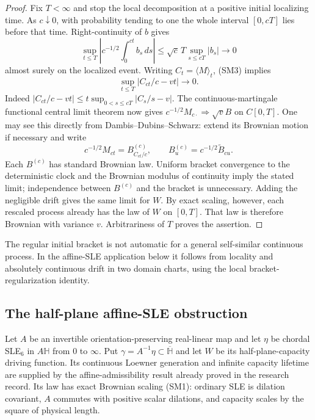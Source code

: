\documentclass[11pt]{article}
\theoremstyle{definition}\newtheorem{definition}[theorem]{Definition}
\theoremstyle{remark}\newtheorem{remark}[theorem]{Remark}
\begin{document}
\begin{proof}
Fix $T<\infty$ and stop the local decomposition at a positive initial
localizing time.  As $c\downarrow0$, with probability tending to one the
whole interval $[0,cT]$ lies before that time.  Right-continuity of $b$ gives
\[
 \sup_{t\leq T}\left|c^{-1/2}\int_0^{ct}b_s\,ds\right|
 \leq\sqrt c\,T\sup_{s\leq cT}|b_s|\longrightarrow0
\]
almost surely on the localized event.  Writing $C_t=\langle M\rangle_t$,
(SM3) implies
\[
 \sup_{t\leq T}|C_{ct}/c-vt|\longrightarrow0.
 \tag{SM4}
\]
Indeed $|C_{ct}/c-vt|\leq t\sup_{0<s\leq cT}|C_s/s-v|$.
The continuous-martingale functional central limit theorem now gives
$c^{-1/2}M_{c\cdot}\Rightarrow\sqrt v B$ on $C[0,T]$.
One may see this directly from Dambis--Dubins--Schwarz: extend its Brownian
motion if necessary and write
\[
 c^{-1/2}M_{ct}=B^{(c)}_{C_{ct}/c},
 \qquad B^{(c)}_u=c^{-1/2}\widetilde B_{cu}.
\]
Each $B^{(c)}$ has standard Brownian law.  Uniform bracket convergence to the
deterministic clock and the Brownian modulus of continuity imply the stated
limit; independence between $B^{(c)}$ and the bracket is unnecessary.
Adding the negligible drift gives the same limit for $W$.
By exact scaling, however, each rescaled process already has the law of
$W$ on $[0,T]$.  That law is therefore Brownian with variance $v$.
Arbitrariness of $T$ proves the assertion.
\end{proof}

The regular initial bracket is not automatic for a general self-similar
continuous process.  In the affine-SLE application below it follows from
locality and absolutely continuous drift in two domain charts, using the
local bracket-regularization identity.

\subsection{The half-plane affine-SLE obstruction}

Let $A$ be an invertible orientation-preserving real-linear map and let
$\eta$ be chordal SLE$_6$ in $A\mathbb H$ from $0$ to $\infty$.  Put
$\gamma=A^{-1}\eta\subset\overline{\mathbb H}$ and let $W$ be its
half-plane-capacity driving function.  Its continuous Loewner generation and
infinite capacity lifetime are supplied by the affine-admissibility result
already proved in the research record.  Its law has exact Brownian scaling
(SM1): ordinary SLE is dilation covariant, $A$ commutes with positive scalar
dilations, and capacity scales by the square of physical length.
\end{document}
